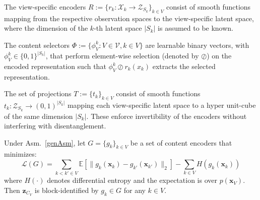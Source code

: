 \documentclass[a4paper,12pt]{article}
\begin{document}
\begin{definition}
  The view-specific encoders $R := \{r_k : \mathcal{X}_k \rightarrow \mathcal{Z}_{S_k}\}_{k \in V}$ consist of smooth functions mapping from the respective observation spaces to the view-specific latent space, where the dimension of the $k$-th latent space $|S_k|$ is assumed to be known.
\end{definition}

\begin{definition}
  The content selectors $\Phi := \{\phi_V^k : V \in \mathcal{V}, k \in V\}$ are learnable binary vectors, with $\phi_V^k \in \{0, 1\}^{|S_k|}$, that perform element-wise selection (denoted by $\oslash$) on the encoded representation such that $\phi_V^k \oslash r_k(x_k)$ extracts the selected representation.
\end{definition}

\begin{definition}[Projections]
  The set of projections $T := \{t_k\}_{k \in V}$ consist of smooth functions $t_k : \mathcal{Z}_{S_k} \rightarrow (0, 1)^{|S_k|}$ mapping each view-specific latent space to a hyper unit-cube of the same dimension $|S_k|$. These enforce invertibility of the encoders without interfering with disentanglement.
\end{definition}

\begin{theorem} \label{thm:contBlock}
  Under Asm.\ \ref{genAsm}, let $G = \{g_k\}_{k \in V}$ be a set of content encoders that minimizes:
  \begin{equation}
    \mathcal{L}(G) = \sum_{k < k' \in V} \mathbb{E} \left[ \|g_k(\mathbf{x}_k) - g_{k'}(\mathbf{x}_{k'})\|_2 \right] - \sum_{k \in V} H(g_k(\mathbf{x}_k))
  \end{equation}
  where $H(\cdot)$ denotes differential entropy and the expectation is over $p(\mathbf{x}_V)$. Then $\mathbf{z}_{C_V}$ is block-identified by $g_k \in G$ for any $k \in V$.
\end{theorem}
\end{document}
